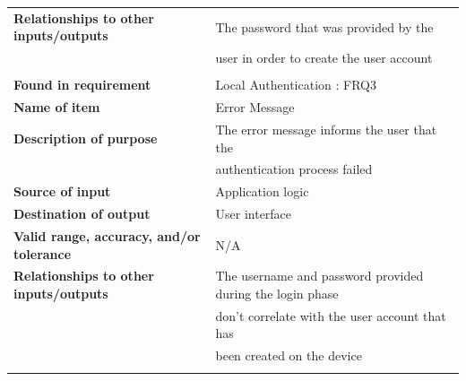 \begin{tabular}{ll}
\textbf{Relationships to other inputs/outputs}&The password that was provided by the\\& user in order to create the user account\\
&\\
\textbf{Found in requirement}&Local Authentication : FRQ3\\
\textbf{Name of item}&Error Message\\
\textbf{Description of purpose}&The error message informs the user that the\\& authentication process failed\\
\textbf{Source of input}&Application logic\\
\textbf{Destination of output}&User interface\\
\textbf{Valid range, accuracy, and/or tolerance}&N/A\\
\textbf{Relationships to other inputs/outputs}&The username and password provided during the login phase\\& don't correlate with the user account that has\\& been created on the device\\
&\\
\end{tabular}
\newpage
